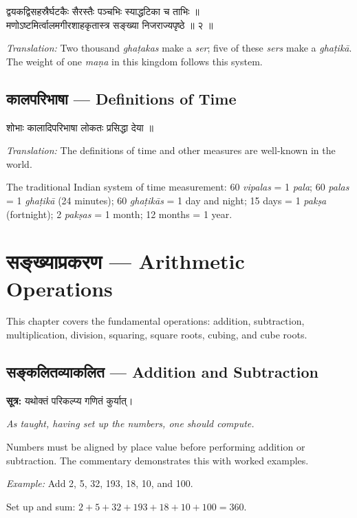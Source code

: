 \documentclass[10pt,a4paper]{article}
\newenvironment{sanskritverse}{%
  \begin{center}%
  \begin{minipage}{0.94\textwidth}%
  \centering\devanagarifont\small%
}{%
  \end{minipage}%
  \end{center}%
  \vspace{0.1em}%
}
\newcommand{\sutratxt}[2]{%
  \begin{center}%
  \colorbox{sanskritbg}{%
    \begin{minipage}{0.93\textwidth}%
    \centering\small\vspace{3pt}%
    {\devanagarifont\textbf{सूत्र:} #1}\par\vspace{2pt}%
    \textit{#2}\vspace{3pt}%
    \end{minipage}%
  }%
  \end{center}%
  \vspace{0.1em}%
}
\begin{document}
\begin{sanskritverse}
द्वयकद्विसहस्रैर्घटकैः सैरस्तैः पञ्चभिः स्याद्धटिका च ताभिः ॥\\
मणोऽष्टमिर्त्वालमगीरशाहकृतास्त्र सङ्ख्या निजराज्यपृष्ठे ॥ २ ॥
\end{sanskritverse}
\textit{Translation:} Two thousand \textit{ghaṭakas} make a \textit{ser}; five of these \textit{sers} make a \textit{ghaṭikā}. The weight of one \textit{maṇa} in this kingdom follows this system.

\subsection{कालपरिभाषा — Definitions of Time}

\begin{sanskritverse}
शोभाः कालादिपरिभाषा लोकतः प्रसिद्धा देया ॥
\end{sanskritverse}
\textit{Translation:} The definitions of time and other measures are well-known in the world.

The traditional Indian system of time measurement: 60 \textit{vipalas} = 1 \textit{pala}; 60 \textit{palas} = 1 \textit{ghaṭikā} (24 minutes); 60 \textit{ghaṭikās} = 1 day and night; 15 days = 1 \textit{pakṣa} (fortnight); 2 \textit{pakṣas} = 1 month; 12 months = 1 year.

\section{सङ्ख्याप्रकरण — Arithmetic Operations}
\label{sec:sankhya}

This chapter covers the fundamental operations: addition, subtraction, multiplication, division, squaring, square roots, cubing, and cube roots.

\subsection{सङ्कलितव्याकलित — Addition and Subtraction}

\sutratxt{यथोक्तं परिकल्प्य गणितं कुर्यात्।}{As taught, having set up the numbers, one should compute.}

Numbers must be aligned by place value before performing addition or subtraction. The commentary demonstrates this with worked examples.

\textit{Example:} Add 2, 5, 32, 193, 18, 10, and 100.

Set up and sum: $2+5+32+193+18+10+100 = 360$.
\end{document}
